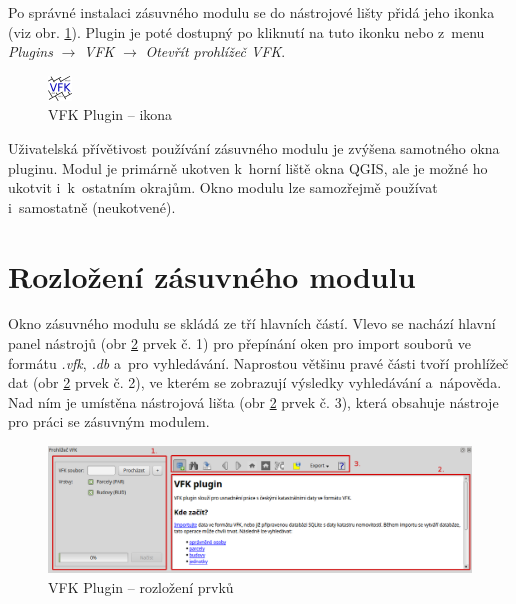 \documentclass[a4paper,12pt,oneside]{book}
\begin{document}
Po správné instalaci zásuvného modulu se do nástrojové lišty přidá jeho ikonka (viz obr. \ref{l_plugin_ikona}). Plugin je poté dostupný po kliknutí na tuto ikonku nebo z~menu \textit{Plugins} $\rightarrow$ \textit{VFK} $\rightarrow$ \textit{Otevřít prohlížeč VFK}.

\begin{figure}[H]
\centering
\includegraphics[scale=0.9]{images/vfkPluginIcon.png}
\caption[VFK Plugin -- ikona]{VFK Plugin -- ikona}
\label{l_plugin_ikona}
\end{figure}

Uživatelská přívětivost používání zásuvného modulu je zvýšena  samotného okna pluginu. Modul je primárně ukotven k~horní liště okna QGIS, ale je možné ho ukotvit i~k~ostatním okrajům. Okno modulu lze samozřejmě používat i~samostatně (neukotvené).

\clearpage
\section{Rozložení zásuvného modulu}
Okno zásuvného modulu se skládá ze tří hlavních částí. Vlevo se nachází hlavní panel nástrojů (obr \ref{l_plugin_prirucka_rozlozeni} prvek č. 1) pro přepínání oken pro import souborů ve formátu \textit{.vfk}, \textit{.db} a~pro vyhledávání. Naprostou většinu pravé části tvoří prohlížeč dat (obr \ref{l_plugin_prirucka_rozlozeni} prvek č. 2), ve kterém se zobrazují výsledky vyhledávání a~nápověda. Nad ním je umístěna nástrojová lišta (obr \ref{l_plugin_prirucka_rozlozeni} prvek č. 3), která obsahuje nástroje pro práci se zásuvným modulem. 

\begin{figure}[H]
\centering
\includegraphics[width=1\textwidth]{images/vfkPlugin-prirucka_rozlozeni.png}
\caption[VFK Plugin -- rozložení prvků]{VFK Plugin -- rozložení prvků}
\label{l_plugin_prirucka_rozlozeni}
\end{figure}
\end{document}
